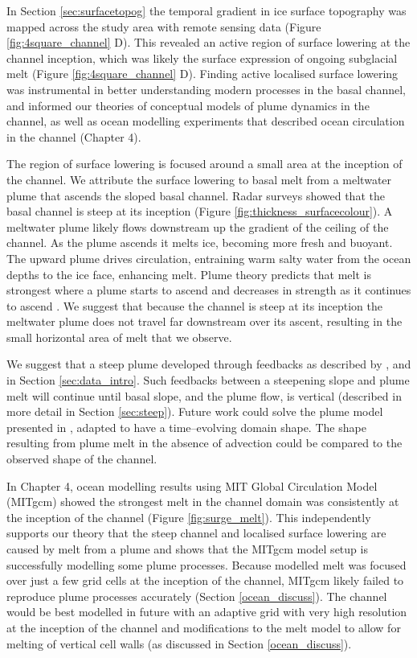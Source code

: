 In Section \ref{sec:surfacetopog} the temporal gradient in ice surface topography was mapped across the study area with remote sensing data (Figure \ref{fig:4square_channel} D). This revealed an active region of surface lowering at the channel inception, which was likely the surface expression of ongoing subglacial melt (Figure \ref{fig:4square_channel} D).  
Finding active localised surface lowering was instrumental in better understanding modern processes in the basal channel, and informed our theories of conceptual models of plume dynamics in the channel, as well as ocean modelling experiments that described ocean circulation in the channel (Chapter 4). 

The region of surface lowering is focused around a small area at the inception of the channel. We attribute the surface lowering to basal melt from a meltwater plume that ascends the sloped basal channel. Radar surveys showed that the basal channel is steep at its inception (Figure \ref{fig:thickness_surfacecolour}). A meltwater plume likely flows downstream up the gradient of the ceiling of the channel. As the plume ascends it melts ice, becoming more fresh and buoyant. The upward plume drives circulation, entraining warm salty water from the ocean depths to the ice face, enhancing melt.  Plume theory predicts that melt is strongest where a plume starts to ascend and decreases in strength as it continues to ascend \citep{jenkins1991one}. We suggest that because the channel is steep at its inception the meltwater plume does not travel far downstream over its ascent, resulting in the small horizontal area of melt that we observe. 

We suggest that a steep plume developed through feedbacks as described by \cite{sergienko2013basal}, and in Section \ref{sec:data_intro}. Such feedbacks between a steepening slope and plume melt will continue until basal slope, and the plume flow, is vertical (described in more detail in Section \ref{sec:steep}).    
Future work could solve the plume model presented in \cite{jenkins2011convection}, adapted to have a time--evolving domain shape. The shape resulting from plume melt in the absence of advection could be compared to the observed shape of the channel. 

In Chapter 4, ocean modelling results using MIT Global Circulation Model (MITgcm) showed the strongest melt in the channel domain was consistently at the inception of the channel (Figure \ref{fig:surge_melt}). This independently supports our theory that the steep channel and localised surface lowering are caused by melt from a plume and shows that the MITgcm model setup is successfully modelling some plume processes.
Because modelled melt was focused over just a few grid cells at the inception of the channel,  MITgcm likely failed to reproduce plume processes accurately (Section \ref{ocean_discuss}). The channel would be best modelled in future with an adaptive grid with very high resolution at the inception of the channel and modifications to the melt model to allow for melting of vertical cell walls (as discussed in Section \ref{ocean_discuss}).

